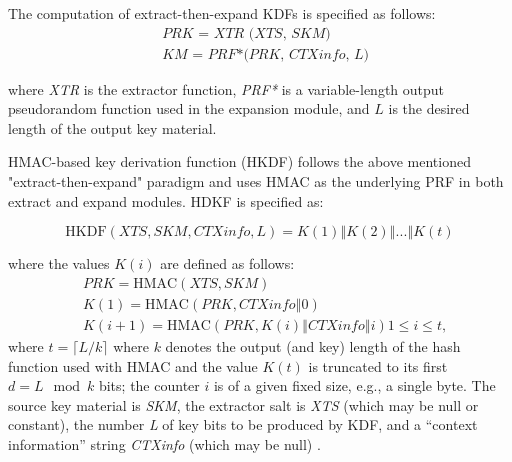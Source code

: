 The computation of extract-then-expand KDFs is specified as follows:
\begin{equation}
\label{eq:hdkf1}
\begin{split}
  & \textit{PRK = XTR (XTS, SKM)} \\
  & \textit{KM = PRF*(PRK, CTXinfo, L)}
\end{split}
\end{equation}
  
where \textit{XTR} is the extractor function, \textit{PRF*} is a variable-length output pseudorandom function used in the expansion module, and $L$ is the desired length of the output key material.

HMAC-based key derivation function (HKDF) \cite{hdkf} follows the above mentioned "extract-then-expand" paradigm and uses HMAC as the underlying PRF in both extract and expand modules. HDKF is specified as: 

\begin{equation}
\label{eq:hdkf}
\text{HKDF}(\textit{XTS}, \textit{SKM}, \textit{CTXinfo}, L) = K(1)\mathbin\Vert K(2) \mathbin\Vert . . . \mathbin\Vert K(t)
\end{equation}

where the values $K(i)$ are defined as follows:
\begin{equation}
\label{eq:hdkf2}
\begin{split}
  &PRK = \text{HMAC}(\textit{XTS}, \textit{SKM}) \\
  &K(1) = \text{HMAC}(\textit{PRK}, \textit{CTXinfo} \mathbin\Vert 0) \\
  &K(i + 1) = \text{HMAC}(\textit{PRK}, K(i) \mathbin\Vert \textit{CTXinfo} \mathbin\Vert i) 1 \leq i \le t,
\end{split}
\end{equation}
where $t = \lceil L/k \rceil$  where $k$ denotes the output (and key) length of the hash function used with HMAC and the value $K(t)$ is truncated to its first $d = L \mod k$ bits; the counter $i$ is of a given fixed size, e.g., a single byte. The source key material is \textit{SKM}, the extractor salt is \textit{XTS} (which may be null or constant), the number \textit{L} of key bits to be produced by KDF, and a ``context information'' string \textit{CTXinfo} (which may be null) \cite{hdkf}.

